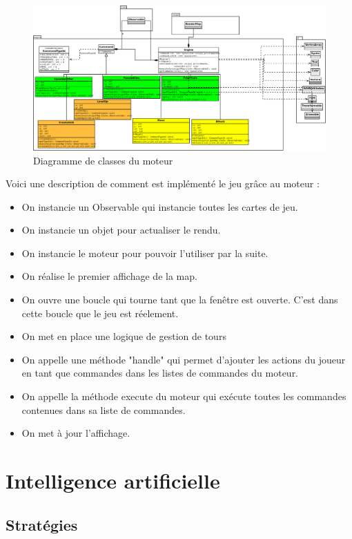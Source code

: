 \documentclass[12pt,a4paper]{article}
\begin{document}
\begin{figure}[!ht]
\centering
    \includegraphics[width=1\textwidth]{ressources/engine.png}
     \caption{Diagramme de classes du moteur}
\end{figure}
\newpage
Voici une description de comment est implémenté le jeu grâce au moteur : \begin{itemize}
    \item On instancie un Observable qui instancie toutes les cartes de jeu.
    \item On instancie un objet pour actualiser le rendu. 
    \item On instancie le moteur pour pouvoir l'utiliser par la suite.
    \item On réalise le premier affichage de la map. 
    \item On ouvre une boucle qui tourne tant que la fenêtre est ouverte. C'est dans cette boucle que le jeu est réelement. 
    \item On met en place une logique de gestion de tours
    \item On appelle une méthode "handle" qui permet d'ajouter les actions du joueur en tant que commandes dans les listes de commandes du moteur. 
    \item On appelle la méthode execute du moteur qui exécute toutes les commandes contenues dans sa liste de commandes.
    \item On met à jour l'affichage. 
\end{itemize}
\newpage
\section{Intelligence artificielle}

\subsection{Stratégies}
\end{document}
